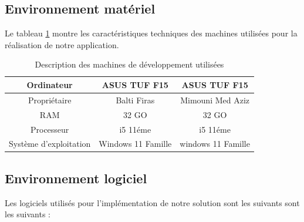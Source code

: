 \subsection{Environnement matériel}
\noindent Le tableau \ref{tab:my_label} montre les caractéristiques techniques des machines utilisées pour la réalisation de notre application.
\bigskip
\begin{table}[!ht]
\renewcommand{\arraystretch}{1.9}
    \centering
    \begin{tabular}{|c|c|c|}
        \hline
        Ordinateur & ASUS TUF F15  & ASUS TUF F15  \\
        \hline
        Propriétaire & Balti Firas & Mimouni Med Aziz \\
        \hline
        RAM & 32 GO & 32 GO \\
        \hline
        Processeur& i5 11éme & i5 11éme\\
         \hline
        Système d’exploitation & Windows 11 Famille & windows 11 Famille\\
        \hline
    \end{tabular}
\bigskip
    \caption{Description des machines de développement utilisées}
    \label{tab:my_label}
\end{table}




\newpage
 \subsection{ Environnement logiciel }
\noindent Les logiciels utilisés pour l’implémentation de notre solution sont les suivants sont les suivants :


